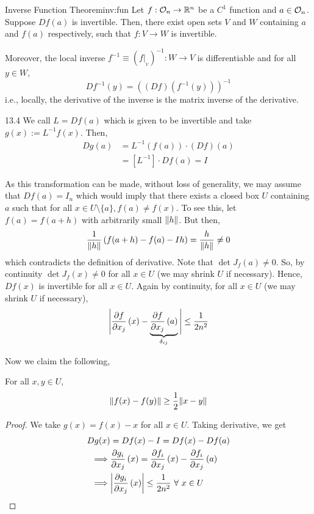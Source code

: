 \documentclass[../Analysis-3.tex]{subfiles}
\begin{document}
\begin{Thm}{Inverse Function Theorem}{inv:fun}
  Let $ f:\mathcal{O}_{n} \to \mathbb{R}^n $ be a $ C^1 $ function and $ a \in \mathcal{O}_{n} $. Suppose $ Df(a) $ is invertible. Then, there exist open sets $ V $ and $ W $ containing $ a $ and $ f(a) $ respectively, such that $ f: V \to W $ is invertible.

  \;

  Moreover, the local inverse $ f^{-1} \equiv \left( f\vert_{{}_V} \right)^{-1} : W \to V $ is differentiable and for all $ y \in W $,
  \[ Df^{-1}(y) = \left( \left( Df \right)\left( f^{-1}(y) \right) \right)^{-1} \]
  i.e., locally, the derivative of the inverse is the matrix inverse of the derivative.
\end{Thm}

\begin{proofFig}{}{}{\label{fig:inf:fun}}{13}{.4\textwidth}
  We call $ L = Df(a) $ which is given to be invertible and take $ g(x) := L^{-1}f(x) $. Then,
  \begin{align*}
    Dg(a)
     & = L^{-1}(f(a))\cdot (Df)(a)            \\
     & = \left[ L^{-1} \right]\cdot Df(a) = I
  \end{align*}

  As this transformation can be made, without loss of generality, we may assume that $ Df(a) = I_n $ which would imply that there exists a closed box $ U $ containing $ a $ such that for all $ x\in U\setminus\{a\}, f(a) \not= f(x) $. To see this, let $ f(a) = f(a+h) $ with arbitrarily small $ \norm{h} $. But then,
  \[  \frac{1}{\norm{h}}\left( f(a+h)-f(a)-Ih \right) = \frac{h}{\norm{h}} \not= 0  \]
  which contradicts the definition of derivative. Note that $ \det J_f(a) \not= 0 $. So, by continuity $ \det J_f(x) \not= 0 $ for all $ x \in U $ (we may shrink $ U $ if necessary). Hence, $ Df(x) $ is invertible for all $ x \in U $. Again by continuity, for all $ x \in U $ (we may shrink $ U $ if necessary),
  \[  \Bigg\vert \pdv{f}{x_j}\left( x \right) - \underbrace{\pdv{f}{x_j}\left( a \right)}_{\delta_{ij}} \Bigg\vert \leq \frac{1}{2n^2}  \]

  Now we claim the following,
  \begin{clmBox}
    For all $ x, y \in U $,
    \[  \norm{f(x)-f(y)} \geq \frac{1}{2}\norm{x-y}  \]
  \end{clmBox}

  \begin{proof}
    We take $ g(x) = f(x) - x $ for all $ x \in U $. Taking derivative, we get
    \begin{align*}
      Dg(x)    & = Df(x) - I  = Df(x) - Df(a)                                                                     \\
      \implies & \pdv{g_i}{x_j}\left( x \right) = \pdv{f_i}{x_j}\left( x \right) - \pdv{f_i}{x_j}\left( a \right) \\
      \implies & \abs{\pdv{g_i}{x_j}\left( x \right)} \leq \frac{1}{2n^2} \ \forall\ x \in U
    \end{align*}


\end{proof}
\end{proofFig}
\end{document}
